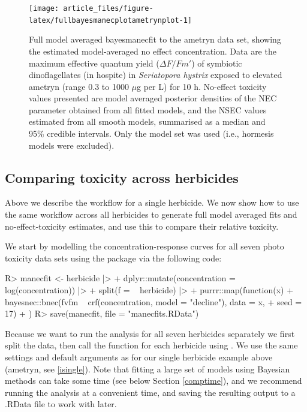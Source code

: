 \documentclass[
  shortnames]{jss}
\begin{document}
\begin{CodeChunk}
\begin{figure}[!ht]

{\centering \texttt{[image: article\_files/figure-latex/fullbayesmanecplotametrynplot-1]} 

}

\caption{Full model averaged bayesmanecfit to the ametryn data set, showing the estimated model-averaged no effect concentration. Data are the maximum effective quantum yield ($\Delta F / Fm'$) of symbiotic dinoflagellates (in hospite) in \textit{Seriatopora hystrix} exposed to elevated ametryn (range 0.3 to 1000 $\mu$g per L) for 10 h. No-effect toxicity values presented are model averaged posterior densities of the NEC parameter obtained from all fitted  models, and the NSEC values estimated from all smooth  models, summarised as a median and 95\% credible intervals. Only the  model set was used (i.e., hormesis models were excluded).}\label{fig:fullbayesmanecplotametrynplot}
\end{figure}
\end{CodeChunk}

\subsection[Comparing toxicity]{Comparing toxicity across herbicides}\label{iall}

Above we describe the workflow for a single herbicide. We now show how to use the same workflow across all herbicides to generate full  model averaged fits and no-effect-toxicity estimates, and use this to compare their relative toxicity.

We start by modelling the concentration-response curves for all seven photo toxicity data sets using the  package via the following code:

\begin{CodeChunk}
\begin{CodeInput}
R> manecfit <- herbicide |>
+   dplyr::mutate(concentration = log(concentration)) |>
+   split(f = ~ herbicide) |>
+   purrr::map(function(x) {
+     bayesnec::bnec(fvfm ~ crf(concentration, model = "decline"), data = x,
+                    seed = 17)
+   })
R> save(manecfit, file = "manecfits.RData")
\end{CodeInput}
\end{CodeChunk}

Because we want to run the analysis for all seven herbicides separately we first split the data, then call the  function for each herbicide using  \citep{purrr}. We use the same settings and default arguments as for our single herbicide example above (ametryn, see \ref{isingle}). Note that fitting a large set of models using Bayesian methods can take some time (see below Section \ref{comptime}), and we recommend running the analysis at a convenient time, and saving the resulting output to a .RData file to work with later.
\end{document}
